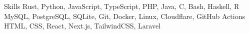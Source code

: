 
\begin{rubric}{Skills}
	Rust, Python, JavaScript, TypeScript, PHP, Java, C, Bash, Haskell, R
	MySQL, PostgreSQL, SQLite, Git, Docker, Linux, Cloudflare, GitHub Actions
	\entry*[Web]
	HTML, CSS, React, Next.js, TailwindCSS, Laravel
\end{rubric}
